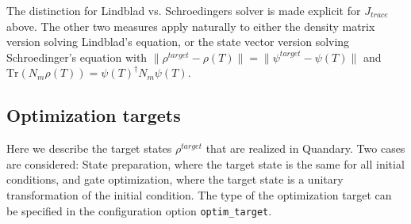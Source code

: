 \documentclass[11pt]{article}
\begin{document}
The distinction for Lindblad vs. Schroedingers solver is made explicit for $J_{trace}$ above. The other two measures apply naturally to either the density matrix version solving Lindblad's equation, or the state vector version solving Schroedinger's equation with $ \|\rho^{target} - \rho(T)\| = \|\psi^{target} - \psi(T)\|$ and $\mbox{Tr}\left(N_m\rho(T)\right) = \psi(T)^\dagger N_m \psi(T)$. 



\subsection{Optimization targets} \label{sec:targets}
Here we describe the target states $\rho^{target}$ that are realized in Quandary. Two cases are considered: State preparation, where the target state is the same for all initial conditions, and gate optimization, where the target state is a unitary transformation of the initial condition. The type of the optimization target can be specified in the configuration option \texttt{optim\_target}. 
\end{document}
